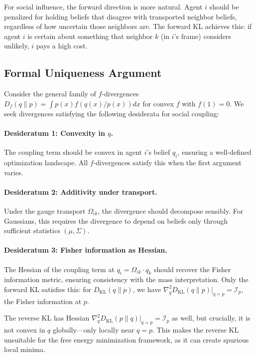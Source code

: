 \documentclass[12pt]{article}
\begin{document}
For social influence, the forward direction is more natural. Agent $i$ should be penalized for holding beliefs that disagree with transported neighbor beliefs, regardless of how uncertain those neighbors are. The forward KL achieves this: if agent $i$ is certain about something that neighbor $k$ (in $i$'s frame) considers unlikely, $i$ pays a high cost.

\subsection{Formal Uniqueness Argument}

Consider the general family of $f$-divergences $D_f(q \| p) = \int p(x) f(q(x)/p(x)) dx$ for convex $f$ with $f(1) = 0$. We seek divergences satisfying the following desiderata for social coupling:

\paragraph{Desideratum 1: Convexity in $q$.} The coupling term should be convex in agent $i$'s belief $q_i$, ensuring a well-defined optimization landscape. All $f$-divergences satisfy this when the first argument varies.

\paragraph{Desideratum 2: Additivity under transport.} Under the gauge transport $\Omega_{ik}$, the divergence should decompose sensibly. For Gaussians, this requires the divergence to depend on beliefs only through sufficient statistics $(\mu, \Sigma)$.

\paragraph{Desideratum 3: Fisher information as Hessian.} The Hessian of the coupling term at $q_i = \Omega_{ik}\cdot q_k$ should recover the Fisher information metric, ensuring consistency with the mass interpretation. Only the forward KL satisfies this: for $D_{\mathrm{KL}}(q \| p)$, we have $\nabla^2_q D_{\mathrm{KL}}(q \| p)\big|_{q=p} = \mathcal{I}_p$, the Fisher information at $p$.

The reverse KL has Hessian $\nabla^2_q D_{\mathrm{KL}}(p \| q)\big|_{q=p} = \mathcal{I}_p$ as well, but crucially, it is not convex in $q$ globally---only locally near $q = p$. This makes the reverse KL unsuitable for the free energy minimization framework, as it can create spurious local minima.
\end{document}
